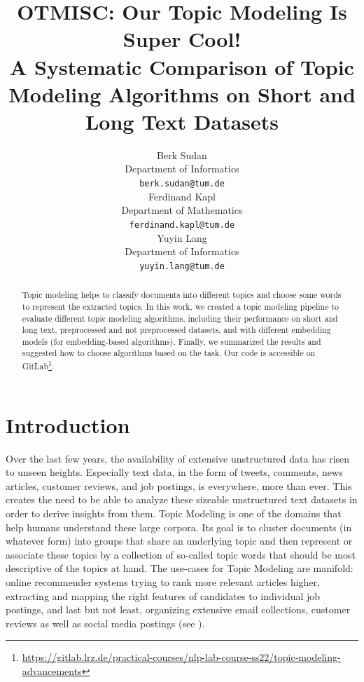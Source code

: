 \documentclass[11pt]{article}
\title{OTMISC: Our Topic Modeling Is Super Cool! \\ 
\large A Systematic Comparison of Topic Modeling Algorithms on Short and Long Text Datasets}
\author{Berk Sudan \\
        Department of Informatics \\
        \texttt{berk.sudan@tum.de} \\\And
        Ferdinand Kapl \\
        Department of Mathematics \\
        \texttt{ferdinand.kapl@tum.de} \\\And
        Yuyin Lang \\
        Department of Informatics \\
        \texttt{yuyin.lang@tum.de}}
\begin{document}
\maketitle
\begin{abstract}
Topic modeling helps to classify documents into different topics and choose some words to represent the extracted topics. In this work, we created a topic modeling pipeline to evaluate different topic modeling algorithms, including their performance on short and long text, preprocessed and not preprocessed datasets, and with different embedding models (for embedding-based algorithms). Finally, we summarized the results and suggested how to choose algorithms based on the task. Our code is accessible on GitLab\footnote{\url{https://gitlab.lrz.de/practical-courses/nlp-lab-course-ss22/topic-modeling-advancements}}.

\end{abstract}
\section{Introduction}
Over the last few years, the availability of extensive unstructured data has risen to unseen heights. Especially text data, in the form of tweets, comments, news articles, customer reviews, and job postings, is everywhere, more than ever. This creates the need to be able to analyze these sizeable unstructured text datasets in order to derive insights from them. Topic Modeling is one of the domains that help humans understand these large corpora. Its goal is to cluster documents (in whatever form) into groups that share an underlying topic and then represent or associate these topics by a collection of so-called topic words that should be most descriptive of the topics at hand. The use-cases for Topic Modeling are manifold: online recommender systems trying to rank more relevant articles higher, extracting and mapping the right features of candidates to individual job postings, and last but not least, organizing extensive email collections, customer reviews as well as social media postings (see \citealp{lda-bert}). 
\end{document}
